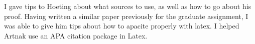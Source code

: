 \documentclass[a4paper,titlepage, margin, 11pt]{article}
\numberwithin{equation}{section}
\begin{document}
\begin{appendices}
I gave tips to Hoeting about what sources to use, as well as how to go about his proof. Having written a similar paper previously for the graduate assignment, I was able to give him tips about how to apacite properly with latex. I helped Artnak use an APA citation package in Latex.

\newpage

\end{appendices}








\citep{solutionOfTSP}
\citep{heldKarp}
\citep{heldKarpYoutube}
\citep{christofides}
\citep{nearestNeighbor}
\citep{greedycrossover}
\citep{github}\\
\end{document}
